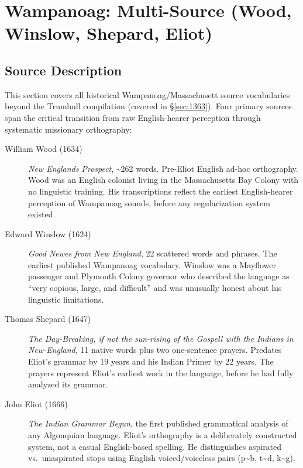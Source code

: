 
\section{Wampanoag: Multi-Source (Wood, Winslow, Shepard, Eliot)}
\label{sec:1365}

\subsection{Source Description}

This section covers all historical Wampanoag/Massachusett source vocabularies
beyond the Trumbull compilation (covered in \S\ref{sec:1363}). Four primary
sources span the critical transition from raw English-hearer perception through
systematic missionary orthography:

\begin{description}
  \item[William Wood (1634)] \emph{New Englands Prospect}, \textasciitilde262
    words. Pre-Eliot English ad-hoc orthography. Wood was an English colonist
    living in the Massachusetts Bay Colony with no linguistic training. His
    transcriptions reflect the earliest English-hearer perception of Wampanoag
    sounds, before any regularization system existed.
  \item[Edward Winslow (1624)] \emph{Good Newes from New England}, 22 scattered
    words and phrases. The earliest published Wampanoag vocabulary. Winslow was
    a Mayflower passenger and Plymouth Colony governor who described the
    language as ``very copious, large, and difficult'' and was unusually honest
    about his linguistic limitations.
  \item[Thomas Shepard (1647)] \emph{The Day-Breaking, if not the sun-rising
    of the Gospell with the Indians in New-England}, 11 native words plus two
    one-sentence prayers. Predates Eliot's grammar by 19 years and his Indian
    Primer by 22 years. The prayers represent Eliot's earliest work in the
    language, before he had fully analyzed its grammar.
  \item[John Eliot (1666)] \emph{The Indian Grammar Begun}, the first published
    grammatical analysis of any Algonquian language. Eliot's orthography is a
    deliberately constructed system, not a casual English-based spelling. He
    distinguishes aspirated vs.\ unaspirated stops using English voiced/voiceless
    pairs (p\textasciitilde b, t\textasciitilde d, k\textasciitilde g).
\end{description}

